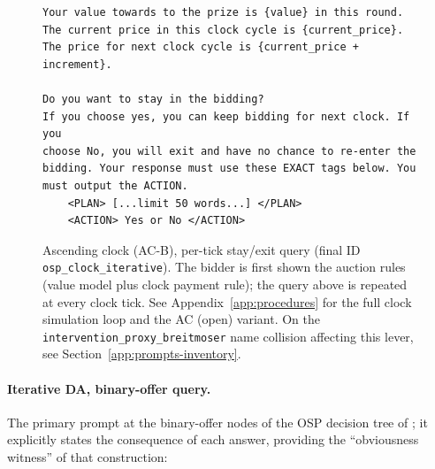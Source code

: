 \begin{figure}[H]
\begin{lstlisting}
Your value towards to the prize is {value} in this round.
The current price in this clock cycle is {current_price}.
The price for next clock cycle is {current_price + increment}.

Do you want to stay in the bidding?
If you choose yes, you can keep bidding for next clock. If you
choose No, you will exit and have no chance to re-enter the
bidding. Your response must use these EXACT tags below. You
must output the ACTION.
    <PLAN> [...limit 50 words...] </PLAN>
    <ACTION> Yes or No </ACTION>
\end{lstlisting}
\caption{Ascending clock (AC-B), per-tick stay/exit query (final ID \texttt{osp\_clock\_iterative}). The bidder is first shown the auction rules (value model plus clock payment rule); the query above is repeated at every clock tick. See Appendix~\ref{app:procedures} for the full clock simulation loop and the AC (open) variant. On the \texttt{intervention\_proxy\_breitmoser} name collision affecting this lever, see Section~\ref{app:prompts-inventory}.}
\label{fig:prompt-clock-iterative}
\end{figure}

\paragraph{Iterative DA, binary-offer query.} The primary prompt at the binary-offer nodes of the OSP decision tree of \citet{ashlagi2018stable}; it explicitly states the consequence of each answer, providing the ``obviousness witness'' of that construction:

